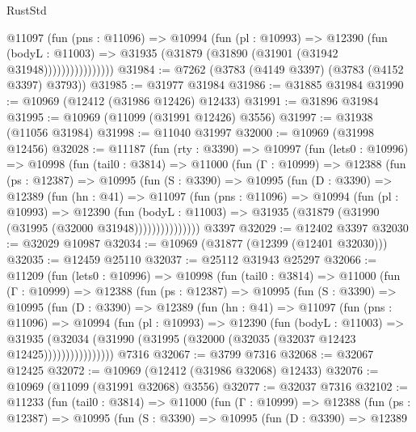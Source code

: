 \begin{lexlean}{RustStd}
\begin{coremodule}
                    @11097
                      (fun (pns : @11096) =>
                      @10994
                        (fun (pl : @10993) =>
                        @12390
                          (fun (bodyL : @11003) =>
                          @31935 (@31879 (@31890 (@31901 (@31942 @31948))))))))))))))))
@31984 := @7262 (@3783 (@4149 @3397) (@3783 (@4152 @3397) @3793))
@31985 := @31977 @31984
@31986 := @31885 @31984
@31990 := @10969 (@12412 (@31986 @12426) @12433)
@31991 := @31896 @31984
@31995 := @10969 (@11099 (@31991 @12426) @3556)
@31997 := @31938 (@11056 @31984)
@31998 := @11040 @31997
@32000 := @10969 (@31998 @12456)
@32028 := @11187
    (fun (rty : @3390) =>
    @10997
      (fun (lets0 : @10996) =>
      @10998
        (fun (tail0 : @3814) =>
        @11000
          (fun (Γ : @10999) =>
          @12388
            (fun (ps : @12387) =>
            @10995
              (fun (S : @3390) =>
              @10995
                (fun (D : @3390) =>
                @12389
                  (fun (hn : @41) =>
                  @11097
                    (fun (pns : @11096) =>
                    @10994
                      (fun (pl : @10993) =>
                      @12390
                        (fun (bodyL : @11003) =>
                        @31935 (@31879 (@31990 (@31995 (@32000 @31948)))))))))))))))
    @3397
@32029 := @12402 @3397
@32030 := @32029 @10987
@32034 := @10969 (@31877 (@12399 (@12401 @32030)))
@32035 := @12459 @25110
@32037 := @25112 @31943 @25297
@32066 := @11209
    (fun (lets0 : @10996) =>
    @10998
      (fun (tail0 : @3814) =>
      @11000
        (fun (Γ : @10999) =>
        @12388
          (fun (ps : @12387) =>
          @10995
            (fun (S : @3390) =>
            @10995
              (fun (D : @3390) =>
              @12389
                (fun (hn : @41) =>
                @11097
                  (fun (pns : @11096) =>
                  @10994
                    (fun (pl : @10993) =>
                    @12390
                      (fun (bodyL : @11003) =>
                      @31935
                        (@32034
                          (@31990 (@31995 (@32000 (@32035 (@32037 @12423 @12425))))))))))))))))
    @7316
@32067 := @3799 @7316
@32068 := @32067 @12425
@32072 := @10969 (@12412 (@31986 @32068) @12433)
@32076 := @10969 (@11099 (@31991 @32068) @3556)
@32077 := @32037 @7316
@32102 := @11233
    (fun (tail0 : @3814) =>
    @11000
      (fun (Γ : @10999) =>
      @12388
        (fun (ps : @12387) =>
        @10995
          (fun (S : @3390) =>
          @10995
            (fun (D : @3390) =>
            @12389

\end{coremodule}
\end{lexlean}
